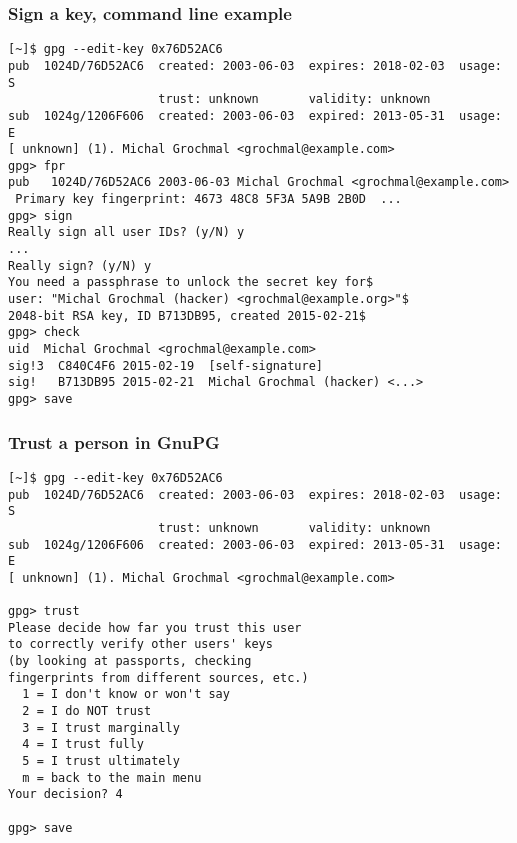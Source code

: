 \documentclass[hyperref={colorlinks=true}]{beamer}
\begin{document}
\begin{frame}[fragile]\frametitle{Sign a key, command line example}
{\scriptsize
\begin{verbatim}
[~]$ gpg --edit-key 0x76D52AC6
pub  1024D/76D52AC6  created: 2003-06-03  expires: 2018-02-03  usage: S
                     trust: unknown       validity: unknown
sub  1024g/1206F606  created: 2003-06-03  expired: 2013-05-31  usage: E
[ unknown] (1). Michal Grochmal <grochmal@example.com>
gpg> fpr
pub   1024D/76D52AC6 2003-06-03 Michal Grochmal <grochmal@example.com>
 Primary key fingerprint: 4673 48C8 5F3A 5A9B 2B0D  ...
gpg> sign
Really sign all user IDs? (y/N) y
...
Really sign? (y/N) y
You need a passphrase to unlock the secret key for$
user: "Michal Grochmal (hacker) <grochmal@example.org>"$
2048-bit RSA key, ID B713DB95, created 2015-02-21$
gpg> check
uid  Michal Grochmal <grochmal@example.com>
sig!3  C840C4F6 2015-02-19  [self-signature]
sig!   B713DB95 2015-02-21  Michal Grochmal (hacker) <...>
gpg> save
\end{verbatim}
}
\end{frame}

\begin{frame}[fragile]\frametitle{Trust a person in GnuPG}
{\scriptsize
\begin{verbatim}
[~]$ gpg --edit-key 0x76D52AC6
pub  1024D/76D52AC6  created: 2003-06-03  expires: 2018-02-03  usage: S
                     trust: unknown       validity: unknown
sub  1024g/1206F606  created: 2003-06-03  expired: 2013-05-31  usage: E
[ unknown] (1). Michal Grochmal <grochmal@example.com>

gpg> trust
Please decide how far you trust this user
to correctly verify other users' keys
(by looking at passports, checking
fingerprints from different sources, etc.)
  1 = I don't know or won't say
  2 = I do NOT trust
  3 = I trust marginally
  4 = I trust fully
  5 = I trust ultimately
  m = back to the main menu
Your decision? 4

gpg> save
\end{verbatim}
}
\end{frame}
\end{document}
